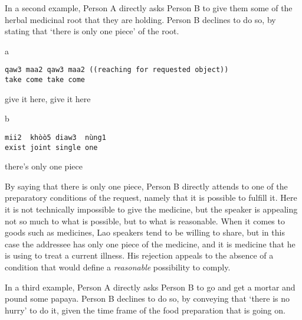 \documentclass[output=paper]{langsci/langscibook}
\begin{document}
In a second example, Person A directly asks Person B to give them some of the herbal medicinal root that they are holding. Person B declines to do so, by stating that ‘there is only one piece’ of the root.

\vspace{-1mm}
%
\begin{mdframednoverticalspace}[style=firstfoc]
\begin{transbox}{1}{a}
\begin{verbatim}
qaw3 maa2 qaw3 maa2 ((reaching for requested object))
take come take come
\end{verbatim}
give it here, give it here
\end{transbox}
\end{mdframednoverticalspace}
%
\begin{mdframednoverticalspace}[style=secondfoc]
\begin{transbox}{2}{b}
\begin{verbatim}
mii2  khòò5 diaw3  nùng1
exist joint single one
\end{verbatim}
there's only one piece
\end{transbox}
\end{mdframednoverticalspace}\bigskip

By saying that there is only one piece, Person B directly attends to one of the preparatory conditions of the request, namely that it is possible to fulfill it. Here it is not technically impossible to give the medicine, but the speaker is appealing not so much to what is possible, but to what is reasonable. When it comes to goods such as medicines, Lao speakers tend to be willing to share, but in this case the addressee has only one piece of the medicine, and it is medicine that he is using to treat a current illness. His rejection appeals to the absence of a condition that would define a \textit{reasonable} possibility to comply.

In a third example, Person A directly asks Person B to go and get a mortar and pound some papaya. Person B declines to do so, by conveying that ‘there is no hurry’ to do it, given the time frame of the food preparation that is going on.
\end{document}
